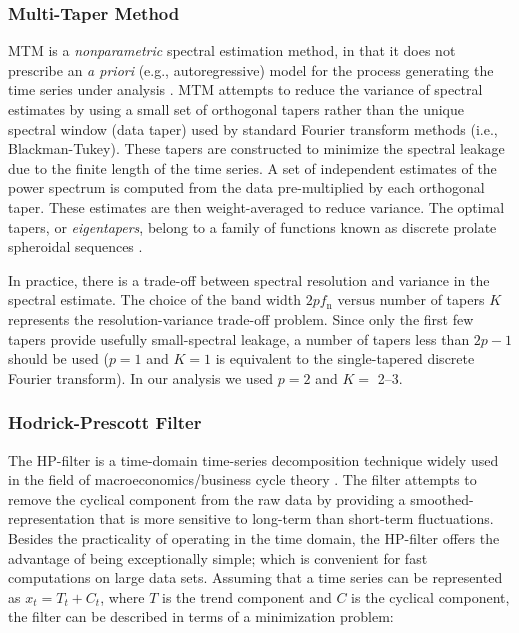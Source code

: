 \subsubsection*{Multi-Taper Method}

MTM is a \emph{nonparametric} spectral estimation method, in that it does not prescribe an {\it a priori} (e.g., autoregressive) model for the process generating the time series under analysis \parencite{Thomson1982, Percival1993}. MTM attempts to reduce the variance of spectral estimates by using a small set of orthogonal tapers rather than the unique spectral window (data taper) used by standard Fourier transform methods (i.e., Blackman-Tukey). These tapers are constructed to minimize the spectral leakage due to the finite length of the time series. A set of independent estimates of the power spectrum is computed from the data pre-multiplied by each orthogonal taper. These estimates are then weight-averaged to reduce variance. The optimal tapers, or \emph{eigentapers}, belong to a family of functions known as discrete prolate spheroidal sequences \parencite[see][]{Percival1993}.

In practice, there is a trade-off between spectral resolution and variance in the spectral estimate. The choice of the band width $2 p f_\text{n}$ versus number of tapers $K$ represents the resolution-variance trade-off problem. Since only the first few tapers provide usefully small-spectral leakage, a number of tapers less than $2p - 1$ should be used ($p=1$ and $K=1$ is equivalent to the single-tapered discrete Fourier transform). In our analysis we used $p=2$ and $K=$ 2--3.

\subsubsection*{Hodrick-Prescott Filter}

The HP-filter is a time-domain time-series decomposition technique widely used in the field of macroeconomics/business cycle theory \parencite{Hodrick1997}. The filter attempts to remove the cyclical component from the raw data by providing a smoothed-representation that is more sensitive to long-term than short-term fluctuations. Besides the practicality of operating in the time domain, the HP-filter offers the advantage of being exceptionally simple; which is convenient for fast computations on large data sets. Assuming that a time series can be represented as $x_t = T_t + C_t$, where $T$ is the trend component and $C$ is the cyclical component, the filter can be described in terms of a minimization problem:

